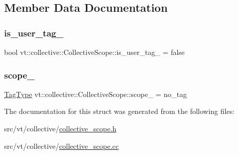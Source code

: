 \subsection{Member Data Documentation}
\mbox{\label{structvt_1_1collective_1_1_collective_scope_a2a291ca3421aab53d63088bd84fd7091}} 
\subsubsection{\texorpdfstring{is\+\_\+user\+\_\+tag\+\_\+}{is\_user\_tag\_}}
{\footnotesize\ttfamily bool vt\+::collective\+::\+Collective\+Scope\+::is\+\_\+user\+\_\+tag\+\_\+ = false\hspace{0.3cm}{\ttfamily [private]}}

\mbox{\label{structvt_1_1collective_1_1_collective_scope_a6a1b0fe51f68913bd2aeaed363a5eab9}} 
\subsubsection{\texorpdfstring{scope\+\_\+}{scope\_}}
{\footnotesize\ttfamily \hyperlink{namespacevt_a84ab281dae04a52a4b243d6bf62d0e52}{Tag\+Type} vt\+::collective\+::\+Collective\+Scope\+::scope\+\_\+ = no\+\_\+tag\hspace{0.3cm}{\ttfamily [private]}}



The documentation for this struct was generated from the following files\+:\begin{DoxyCompactItemize}
\item 
src/vt/collective/\hyperlink{collective__scope_8h}{collective\+\_\+scope.\+h}\item 
src/vt/collective/\hyperlink{collective__scope_8cc}{collective\+\_\+scope.\+cc}\end{DoxyCompactItemize}
